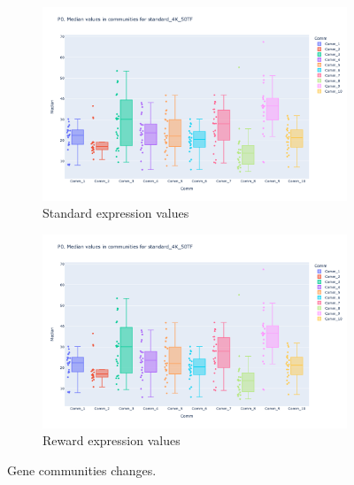 \begin{figure}[!htb]
\begin{subfigure}[b]{0.47\textwidth}
        \includegraphics[width=\textwidth,keepaspectratio]{Sections/Network_I/Resources/P0/Comms/P0_standard_4K_50TF_med.png}
        \caption{Standard expression values}
    \end{subfigure}
    \hfill
    \begin{subfigure}[b]{0.47\textwidth}
        \centering
        \includegraphics[width=\textwidth,keepaspectratio]{Sections/Network_I/Resources/P0/Comms/P0_standard_4K_50TF_med.png}
        \caption{Reward expression values}
    \end{subfigure}
    \hfill
    \caption{Gene communities changes.}
    \label{fig:N_I:p0_comm_chgs}
\end{figure}




